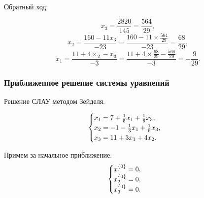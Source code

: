 \documentclass[10pt, a4paper, titlepage]{article}
\begin{document}
Обратный ход:

$$x_3=\frac{2820}{145}=\frac{564}{29},$$
$$x_2=\frac{160-11x_3}{-23}=\frac{160-11\times\frac{564}{29}}{-23}=\frac{68}{29},$$
$$x_1=\frac{11+4\times_2-x_3}{-3}=\frac{11+4\times\frac{68}{29}-\frac{568}{29}}{-3}=-\frac{9}{29}.$$

\subsubsection*{Приближенное решение системы уравнений}

Решение СЛАУ методом Зейделя.

\begin{equation*}
    \begin{cases}
        $$x_1=7+\frac{1}{5}x_1+\frac{1}{6}x_3$$, \\
        $$x_2=-1-\frac{1}{3}x_1+\frac{1}{6}x_3$$, \\
        $$x_3=11+3x_1+4x_2$$.
    \end{cases}
\end{equation*}

Примем за начальное приближение:
\begin{equation*}
    \begin{cases}
        $$x_1^{\{0\}}=0$$, \\
        $$x_2^{\{0\}}=0$$, \\
        $$x_3^{\{0\}}=0$$.
    \end{cases}
\end{equation*}
\end{document}
